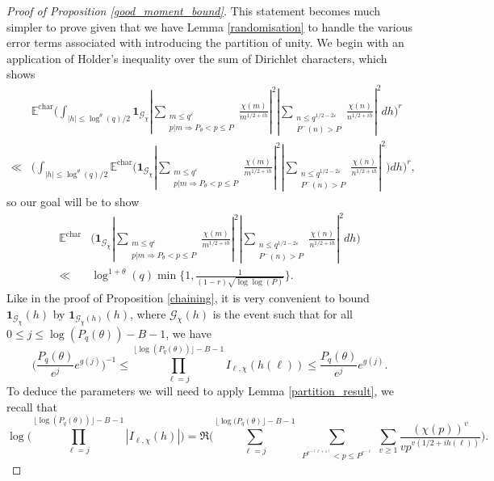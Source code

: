 \documentclass[10pt,a4paper]{amsart}
\numberwithin{equation}{section}
\begin{document}
\begin{proof}[Proof of Proposition \ref{good_moment_bound}]
    This statement becomes much simpler to prove given that we have Lemma \ref{randomisation} to handle the various error terms associated with introducing the partition of unity. We begin with an application of Holder's inequality over the sum of Dirichlet characters, which shows
    \begin{align*}
        &\mathbb{E}^{\text{char}}\big(\int_{|h| \leq \log^\theta(q)/2} \mathbf{1}_{\mathcal{G}_\chi}|\sum_{\substack{m \leq q^\varepsilon \\ p|m \Rightarrow P_\theta < p \leq P}}\frac{\chi(m)}{m^{1/2+ih}}|^2|\sum_{\substack{n \leq q^{1/2-2\varepsilon} \\ P^{-}(n) > P}}\frac{\chi(n)}{n^{1/2+ih}}|^2dh\big)^r \\
        \ll&\big(\int_{|h| \leq \log^\theta(q)/2} \mathbb{E}^{\text{char}}\big(\mathbf{1}_{\mathcal{G}_\chi}|\sum_{\substack{m \leq q^\varepsilon \\ p|m \Rightarrow P_\theta < p \leq P}}\frac{\chi(m)}{m^{1/2+ih}}|^2|\sum_{\substack{n \leq q^{1/2-2\varepsilon} \\ P^{-}(n) > P}}\frac{\chi(n)}{n^{1/2+ih}}|^2\big)dh\big)^r,
    \end{align*}
    so our goal will be to show
    \begin{align*}
        \mathbb{E}^{\text{char}}&\big(\mathbf{1}_{\mathcal{G}_\chi}|\sum_{\substack{m \leq q^\varepsilon \\ p|m \Rightarrow P_\theta < p \leq P}}\frac{\chi(m)}{m^{1/2+ih}}|^2|\sum_{\substack{n \leq q^{1/2-2\varepsilon} \\ P^{-}(n) > P}}\frac{\chi(n)}{n^{1/2+ih}}|^2dh\big) \\ \ll& \log^{1+\theta}(q)\min\big\{1,\frac{1}{(1-r)\sqrt{\log\log(P)}}\big\}.
    \end{align*}
    Like in the proof of Proposition \ref{chaining}, it is very convenient to bound $\mathbf{1}_{\mathcal{G}_\chi}(h)$ by $\mathbf{1}_{\mathcal{G}_\chi(h)}(h)$, where $\mathcal{G}_\chi(h)$ is the event such that for all $0 \leq j \leq \log(P_q(\theta)) - B -1$, we have
$$\big(\frac{P_q(\theta)}{e^j}e^{g(j)}\big)^{-1} \leq \prod_{\ell=j}^{\lfloor\log(P_q(\theta))\rfloor-B-1}I_{\ell,\chi}(h(\ell))\leq \frac{P_q(\theta)}{e^j}e^{g(j)}.$$
To deduce the parameters we will need to apply Lemma \ref{partition_result}, we recall that
$$\log\big(\prod_{\ell=j}^{\lfloor\log(P_q(\theta))\rfloor - B -1}|I_{\ell,\chi}(h)|\big) = \Re\big(\sum_{\ell=j}^{\lfloor\log(P_q(\theta)\rfloor - B -1}\sum_{\substack{P^{e^{-(\ell+1)}} < p \leq P^{e^{-\ell}}}}\sum_{v \geq 1}\frac{(\chi(p))^v}{vp^{v(1/2+ih(\ell))}}\big).$$

\end{proof}
\end{document}
